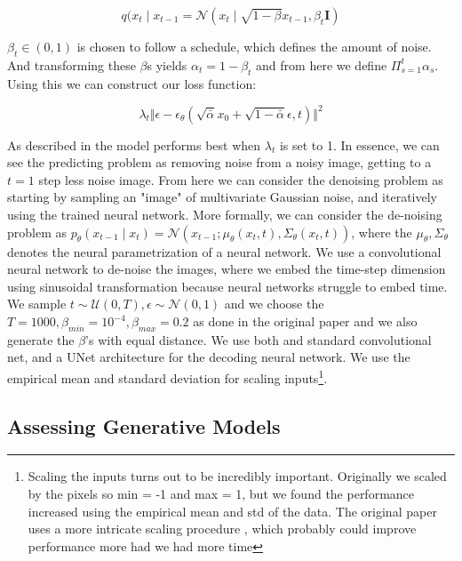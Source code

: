 \begin{equation}
    q(x_t \mid x_{t-1} = \mathcal{N}(x_t \mid \sqrt{1 - \beta} x_{t-1}, \beta_t\mathbf{I})
\end{equation}

$\beta_t \in (0, 1)$ is chosen to follow a schedule, which defines the amount of noise. And transforming these $\beta$s yields $\alpha_t = 1 - \beta_t$ and from here we define $ \Pi_{s=1}^t \alpha_s$. Using this we can construct our loss function:

\begin{equation}
    \lambda_t\Vert \epsilon - \epsilon_\theta (\sqrt{\bar{\alpha}} x_0 + \sqrt{1-\bar{\alpha}}\epsilon, t) \Vert^2
\end{equation}

As described in \cite[p.863, eq. 25.23 and 25.24]{pml2Book} the model performs best when $\lambda_t$ is set to 1. In essence, we can see the predicting problem as removing noise from a noisy image, getting to a $t=1$ step less noise image. From here we can consider the denoising problem as starting by sampling an "image" of multivariate Gaussian noise, and iteratively using the trained neural network. More formally, we can consider the de-noising problem as $p_{\theta}(x_{t-1}\mid x_t) = \mathcal{N}\left(x_{t-1} ; \mu_{\theta}(x_t, t), \Sigma_{\theta}(x_t, t)\right)$, where the $\mu_\theta, \Sigma_\theta$ denotes the neural parametrization of a neural network. We use a convolutional neural network to de-noise the images, where we embed the time-step dimension using sinusoidal transformation because neural networks struggle to embed time.
We sample  $t\sim \mathcal{U}(0, T), \epsilon \sim \mathcal{N}(0, 1)$ and we choose the $T=1000, \beta_{min} = 10^{-4}, \beta_{max} = 0.2$ as done in the original paper \cite{diffusion2020} and we also generate the $\beta$'s with equal distance. We use both and standard convolutional net, and a UNet architecture for the decoding neural network. We use the empirical mean and standard deviation for scaling inputs\footnote{Scaling the inputs turns out to be incredibly important. Originally we scaled by the pixels so min = -1 and max = 1, but we found the performance increased using the empirical mean and std of the data. The original paper uses a more intricate scaling procedure \cite{diffusion2020}, which probably could improve performance more had we had more time}. 

\subsection*{Assessing Generative Models}

